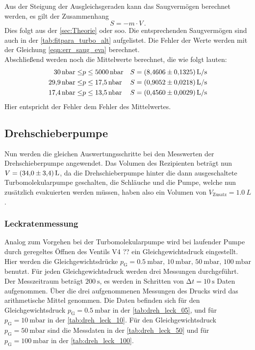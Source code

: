     \noindent Aus der Steigung der Ausgleichsgeraden kann das Saugvermögen berechnet werden, es gilt der Zusammenhang
    \begin{equation*}
      S = - m \cdot V\, .
    \end{equation*}
    Dies folgt aus der \autoref{sec:Theorie} oder soo. Die entsprechenden Saugvermögen sind auch in der \autoref{tab:fitpara_turbo_alt} aufgelistet. 
    Die Fehler der Werte werden mit der Gleichung \eqref{eqn:err_saug_eva} berechnet.\\ 
    Abschließend werden noch die Mittelwerte berechnet, die wie folgt lauten:
    \begin{align*}
      \SI{30}{\nano\bar} \leq &p \leq \SI{5000}{\nano\bar} & S &= \SI{8.4606 \pm 0.1325}{L\per\second} \\
      \SI{29.9}{\nano\bar} \leq &p \leq \SI{17.5}{\nano\bar}& S &= \SI{0.9052 \pm 0.0218}{L\per\second} \\
      \SI{17.4}{\nano\bar} \leq &p \leq \SI{13.5}{\nano\bar} & S &= \SI{0.4560 \pm 0.0029}{L\per\second}
    \end{align*}
    Hier entspricht der Fehler dem Fehler des Mittelwertes.

\subsection{Drehschieberpumpe}

    \noindent Nun werden die gleichen Auswertungsschritte bei den Messwerten der Drehschieberpumpe angewendet. Das Volumen des Rezipienten beträgt nun $V = \SI{34 \pm 3.4}{L}$, da die 
    Drehschieberpumpe hinter die dann ausgeschaltete Turbomolekularpumpe geschalten, die Schläuche und die Pumpe, welche nun zusätzlich evakuierten werden müssen, haben also ein Volumen von $V_\text{Zusatz} = \SI{1.0}{L}$. 

    \subsubsection{Leckratenmessung}

    \noindent Analog zum Vorgehen bei der Turbomolekularpumpe wird bei laufender Pumpe durch geregeltes Öffnen des Ventils V4 ?? ein Gleichgewichtsdruck eingestellt. Hier werden die
    Gleichgewichtsdrücke $p_\text{G} = \SI{0.5}{\milli\bar}, \, \SI{10}{\milli\bar}, \, \SI{50}{\milli\bar}, \, \SI{100}{\milli\bar}$ benutzt. Für jeden Gleichgewichtsdruck werden 
    drei Messungen durchgeführt. Der Messzeitraum beträgt $\SI{200}{\second}$, es werden in Schritten von $\increment t = \SI{10}{\second}$ Daten aufgenommen. Über die drei aufgenommenen
    Messungen des Drucks wird das arithmetische Mittel genommen. 
    Die Daten befinden sich für den Gleichgewichtsdruck $p_\text{G} = \SI{0.5}{\milli\bar}$ in der \autoref{tab:dreh_leck_05}, und für $p_\text{G} = \SI{10}{\milli\bar}$ in der 
    \autoref{tab:dreh_leck_10}. Für den Gleichgewichtsdruck $p_\text{G} = \SI{50}{\milli\bar}$ sind die Messdaten in der \autoref{tab:dreh_leck_50} und für $p_\text{G} = \SI{100}{\milli\bar}$
    in der \autoref{tab:dreh_leck_100}.

